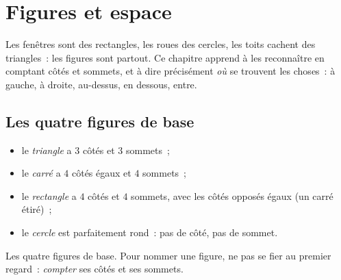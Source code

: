 \chapter{Figures et espace}\label{ch:g1:shapes}

Les fenêtres sont des rectangles, les roues des cercles, les toits
cachent des triangles~: les figures sont partout. Ce chapitre apprend
à les reconnaître en comptant côtés et sommets, et à dire
précisément \emph{où} se trouvent les choses~: à gauche, à
droite, au-dessus, en dessous, entre.

\section{Les quatre figures de base}

\begin{definition}\label{def:g1:shapes:def}
\begin{itemize}
  \item le \emph{triangle} a $3$ côtés et $3$ sommets~;
  \item le \emph{carré} a $4$ côtés égaux et $4$ sommets~;
  \item le \emph{rectangle} a $4$ côtés et $4$ sommets, avec les
        côtés opposés égaux (un carré étiré)~;
  \item le \emph{cercle} est parfaitement rond~: pas de côté, pas
        de sommet.
\end{itemize}
\end{definition}

\begin{omfigure}

{\small Les quatre figures de base. Pour nommer une figure, ne pas se
fier au premier regard~: \emph{compter} ses côtés et ses sommets.}
\end{omfigure}

